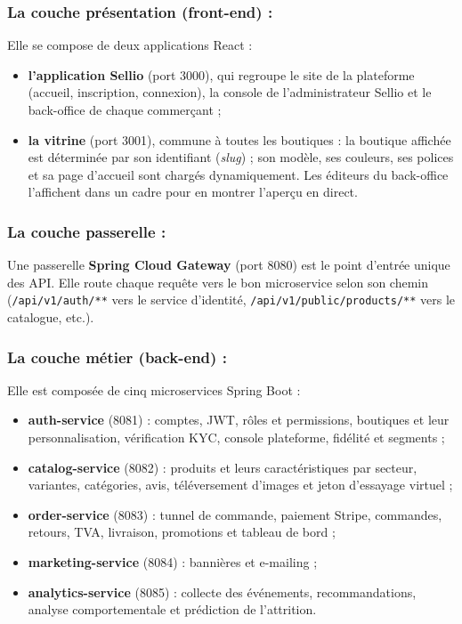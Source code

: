 \subsubsection*{La couche présentation (front-end) :}
Elle se compose de deux applications React :
\begin{itemize}
  \item \textbf{l'application Sellio} (port 3000), qui regroupe le site de la plateforme (accueil, inscription, connexion), la console de l'administrateur Sellio et le back-office de chaque commerçant ;
  \item \textbf{la vitrine} (port 3001), commune à toutes les boutiques : la boutique affichée est déterminée par son identifiant (\textit{slug}) ; son modèle, ses couleurs, ses polices et sa page d'accueil sont chargés dynamiquement. Les éditeurs du back-office l'affichent dans un cadre pour en montrer l'aperçu en direct.
\end{itemize}

\subsubsection*{La couche passerelle :}
Une passerelle \textbf{Spring Cloud Gateway} (port 8080) est le point d'entrée unique des API. Elle route chaque requête vers le bon microservice selon son chemin (\texttt{/api/v1/auth/**} vers le service d'identité, \texttt{/api/v1/public/products/**} vers le catalogue, etc.).

\subsubsection*{La couche métier (back-end) :}
Elle est composée de cinq microservices Spring Boot :
\begin{itemize}
  \item \textbf{auth-service} (8081) : comptes, JWT, rôles et permissions, boutiques et leur personnalisation, vérification KYC, console plateforme, fidélité et segments ;
  \item \textbf{catalog-service} (8082) : produits et leurs caractéristiques par secteur, variantes, catégories, avis, téléversement d'images et jeton d'essayage virtuel ;
  \item \textbf{order-service} (8083) : tunnel de commande, paiement Stripe, commandes, retours, TVA, livraison, promotions et tableau de bord ;
  \item \textbf{marketing-service} (8084) : bannières et e-mailing ;
  \item \textbf{analytics-service} (8085) : collecte des événements, recommandations, analyse comportementale et prédiction de l'attrition.
\end{itemize}

